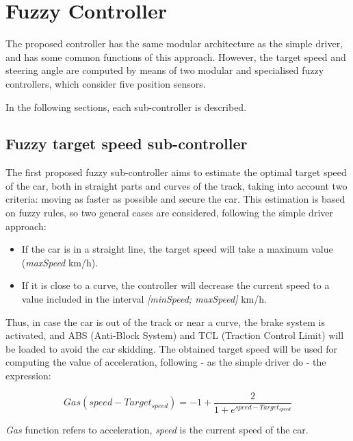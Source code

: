 \documentclass[runningheads,a4paper]{llncs}
\begin{document}
	
	\section{Fuzzy Controller}
	\label{sec:fuzzy_controller}
	
	The proposed controller has the same modular architecture as the simple driver, and has some common functions of this approach. 
	However, the target speed and steering angle are computed by means of two modular and specialised fuzzy controllers, which consider five position sensors.
	
	In the following sections, each sub-controller is described.
	
	
	\subsection{Fuzzy target speed sub-controller}
	
	The first proposed fuzzy sub-controller aims to estimate the optimal target speed of the car, both in straight parts and curves of the track, taking into account two criteria: moving as faster as possible and secure the car. This estimation is based on fuzzy rules, so two general cases are considered, following the simple driver approach:
	
	\begin{itemize}
		\item If the car is in a straight line, the target speed will take a maximum value (\textit{maxSpeed} km/h).
		\item If it is close to a curve, the controller will decrease the current speed to a value included in the interval \textit{[minSpeed; maxSpeed]} km/h.
	\end{itemize}
	
	Thus, in case the car is out of the track or near a curve, the brake system is activated, and ABS (Anti-Block System) and TCL (Traction Control Limit) will be loaded to avoid the car skidding. The obtained target speed will be used for computing the value of acceleration, following - as the simple driver do - the expression:
	
	\begin{equation}	
	Gas(speed-Target_{speed})=-1+\frac{2}{1+e^{speed-Target_{speed}}}	
	\end{equation}
	
	\textit{Gas} function refers to acceleration, \textit{speed} is the current speed of the car.
	
\end{document}
